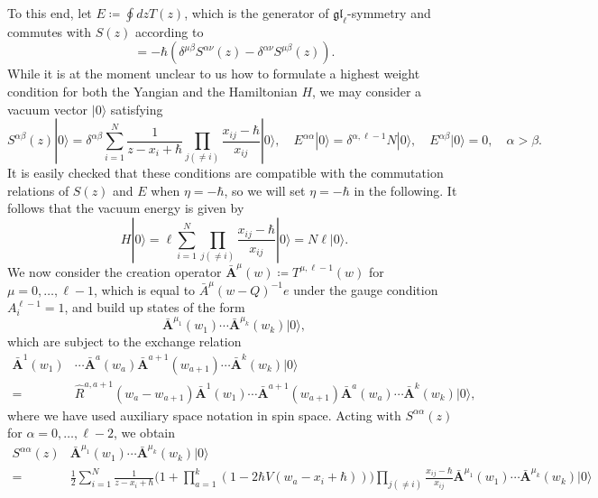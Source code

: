 To this end, let $E \coloneq \oint dz T(z)$, which is the generator of $\mathfrak{gl}_\ell$-symmetry and commutes with $S(z)$ according to
\begin{equation}
[S^{\alpha\beta}(z),E^{\mu\nu}] = -\hbar (\delta^{\mu\beta} S^{\alpha\nu}(z) - \delta^{\alpha\nu} S^{\mu\beta}(z)).
\end{equation}
While it is at the moment unclear to us how to formulate a highest weight condition for both the Yangian and the Hamiltonian $H$, we may consider a vacuum vector $|0\rangle$ satisfying
\begin{equation}
S^{\alpha\beta}(z) |0\rangle = \delta^{\alpha\beta} \sum_{i=1}^N \frac{1}{z-x_i+\hbar} \prod_{j(\neq i)} \frac{x_{ij}-\hbar}{x_{ij}} |0\rangle, \quad E^{\alpha\alpha} |0\rangle = \delta^{\alpha,\ell-1} N |0\rangle, \quad E^{\alpha\beta}|0\rangle = 0, \quad \alpha > \beta.
\end{equation}
It is easily checked that these conditions are compatible with the commutation relations of $S(z)$ and $E$ when $\eta = -\hbar$, so we will set $\eta = -\hbar$ in the following. It follows that the vacuum energy is given by
\begin{equation}
H |0\rangle = \ell \sum_{i=1}^N \prod_{j(\neq i)} \frac{x_{ij}-\hbar}{x_{ij}} |0\rangle = N \ell |0\rangle.
\end{equation}
We now consider the creation operator $\bar{\mathbf{A}}^\mu(w) \coloneq T^{\mu,\ell-1}(w)$ for $\mu = 0,\dots,\ell-1$, which is equal to $\bar A^\mu (w-Q)^{-1} e$ under the gauge condition $A_i^{\ell-1}=1$, and build up states of the form
\begin{equation}
\bar{\mathbf{A}}^{\mu_1}(w_1) \cdots \bar{\mathbf{A}}^{\mu_k}(w_k) |0\rangle,
\end{equation}
which are subject to the exchange relation
\begin{equation}
\begin{aligned}
\bar{\mathbf{A}}^1(w_1) &\cdots \bar{\mathbf{A}}^a(w_a) \bar{\mathbf{A}}^{a+1}(w_{a+1}) \cdots \bar{\mathbf{A}}^k(w_k) |0\rangle \\
={}& \hat R^{a,a+1}(w_a-w_{a+1}) \bar{\mathbf{A}}^1(w_1) \cdots \bar{\mathbf{A}}^{a+1}(w_{a+1}) \bar{\mathbf{A}}^a(w_a) \cdots \bar{\mathbf{A}}^k(w_k) |0\rangle,
\end{aligned}
\end{equation}
where we have used auxiliary space notation in spin space. Acting with $S^{\alpha\alpha}(z)$ for $\alpha = 0,\dots,\ell-2$, we obtain
\begin{equation}
\begin{aligned}
S^{\alpha\alpha}(z) & \bar{\mathbf{A}}^{\mu_1}(w_1) \cdots \bar{\mathbf{A}}^{\mu_k}(w_k) |0\rangle \\
={}& \frac{1}{2} \sum_{i=1}^N \frac{1}{z-x_i+\hbar} \bigg( 1 + \prod_{a=1}^k (1-2\hbar V(w_a-x_i+\hbar)) \bigg) \prod_{j(\neq i)} \frac{x_{ij}-\hbar}{x_{ij}}\bar{\mathbf{A}}^{\mu_1}(w_1) \cdots \bar{\mathbf{A}}^{\mu_k}(w_k) |0\rangle
\end{aligned}
\end{equation}
